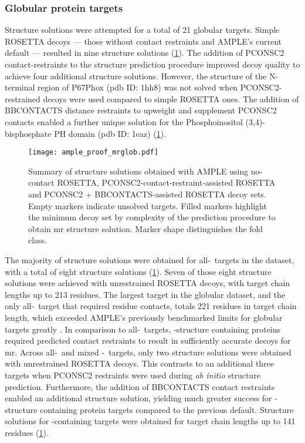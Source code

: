 \subsubsection{Globular protein targets}
Structure solutions were attempted for a total of 21 globular targets. Simple ROSETTA decoys --- those without contact restraints and AMPLE's current default --- resulted in nine structure solutions (\cref{fig:ample_proof_mrglob}). The addition of PCONSC2 contact-restraints to the structure prediction procedure improved decoy quality to achieve four additional structure solutions. However, the structure of the N-terminal region of P67Phox (\gls{pdb} ID: 1hh8) was not solved when PCONSC2-restrained decoys were used compared to simple ROSETTA ones. The addition of BBCONTACTS distance restraints to upweight and supplement PCONSC2 contacts enabled a further unique solution for the Phosphoinositol (3,4)-bisphosphate PH domain (\gls{pdb} ID: 1eaz) (\cref{fig:ample_proof_mrglob}).

\begin{figure}[H]
    \centering
    \texttt{[image: ample\_proof\_mrglob.pdf]}
    \caption[Structure solution summary for globular targets]{Summary of structure solutions obtained with AMPLE using no-contact ROSETTA, PCONSC2-contact-restraint-assisted ROSETTA and PCONSC2 + BBCONTACTS-assisted ROSETTA decoy sets. Empty markers indicate unsolved targets. Filled markers highlight the minimum decoy set by complexity of the prediction procedure to obtain \gls{mr} structure solution. Marker shape distinguishes the fold class.}
    \label{fig:ample_proof_mrglob}
\end{figure}

The majority of structure solutions were obtained for all-\textalpha\ targets in the dataset, with a total of eight structure solutions (\cref{fig:ample_proof_mrglob}). Seven of those eight structure solutions were achieved with unrestrained ROSETTA decoys, with target chain lengths up to 213 residues. The largest target in the globular dataset, and the only all-\textalpha\ target that required residue contacts, totals 221 residues in target chain length, which exceeded AMPLE's previously benchmarked limits for globular targets greatly \cite{Bibby2012-lm}. In comparison to all-\textalpha\ targets, \textbeta-structure containing proteins required predicted contact restraints to result in sufficiently accurate decoys for \gls{mr}. Across all-\textbeta\ and mixed \textalpha-\textbeta\ targets, only two structure solutions were obtained with unrestrained ROSETTA decoys. This contrasts to an additional three targets when PCONSC2 restraints were used during \textit{ab initio} structure prediction. Furthermore, the addition of BBCONTACTS contact restraints enabled an additional structure solution, yielding much greater success for \textbeta-structure containing protein targets compared to the previous default. Structure solutions for \textbeta-containing targets were obtained for target chain lengths up to 141 residues (\cref{fig:ample_proof_mrglob}).

